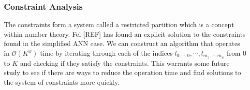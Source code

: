 \subsubsection{Constraint Analysis}

The constraints form a system called a restricted partition which is a concept within number theory. Fel [REF] has found an explicit solution to the constraints found in the simplified ANN case. We can construct an algorithm that operates in $\mathcal{O}(K^w)$ time by iterating through each of the indices $l_{0, \cdots, 0}, \cdots, l_{m_1, \cdots, m_w}$ from $0$ to $K$ and checking if they satisfy the constraints. This warrants some future study to see if there are ways to reduce the operation time and find solutions to the system of constraints more quickly.


